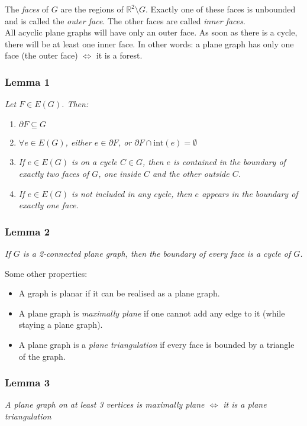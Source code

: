 \documentclass[11pt]{book}
\begin{document}
		The \textit{faces} of $G$ are the regions of $\mathbb{R}^2 \setminus G$. Exactly one of these faces is unbounded and is called the \textit{outer face}. The other faces are called \textit{inner faces}. \\
		
		All acyclic plane graphs will have only an outer face. As soon as there is a cycle, there will be at least one inner face. In other words: a plane graph has only one face (the outer face) $\iff$ it is a forest. 
		
		\subsubsection{Lemma 1} 
		\textit{Let $F \in E(G)$. Then:}
		\begin{enumerate}
			\item $\partial F \subseteq G$
			\item \textit{$\forall e \in E(G)$, either $e \in \partial F$, or $\partial F \cap \text{int}(e) = \emptyset$}
			\item \textit{If $e \in E(G)$ is on a cycle $C \in G$, then $e$ is contained in the boundary of exactly two faces of $G$, one inside $C$ and the other outside $C$.}
			\item \textit{If $e \in E(G)$ is not included in any cycle, then $e$ appears in the boundary of exactly one face.}
		\end{enumerate}
		
		
		\subsubsection{Lemma 2}
		\textit{If $G$ is a 2-connected plane graph, then the boundary of every face is a cycle of $G$.\\}
		
		Some other properties:
		\begin{itemize}
			\item A graph is planar if it can be realised as a plane graph.
			\item A plane graph is \textit{maximally plane} if one cannot add any edge to it (while staying a plane graph).
			\item A plane graph is a \textit{plane triangulation} if every face is bounded by a triangle of the graph.
		\end{itemize}
		
		
		\subsubsection{Lemma 3}
		\textit{A plane graph on at least 3 vertices is maximally plane $\iff$ it is a plane triangulation}
		
\end{document}
